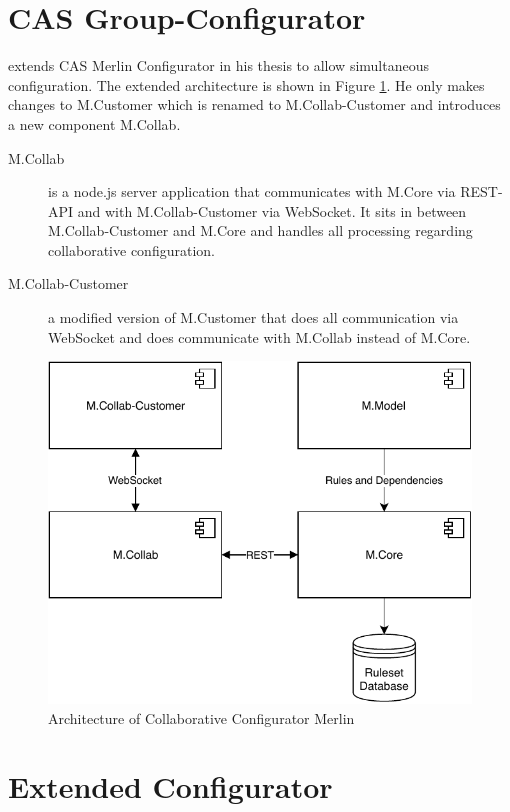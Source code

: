 \section{CAS Group-Configurator}
\label{sec:Concept:GroupConfigurator}


\citeauthor{raabKollaborativeProduktkonfigurationEchtzeit2019} extends CAS Merlin Configurator in his thesis to allow simultaneous configuration. The extended architecture is shown in Figure \ref{fig:Concept:CollaborativeConfiguratorMerlin}.
He only makes changes to M.Customer which is renamed to M.Collab-Customer and introduces a new component M.Collab.

\begin{description}
    \item[M.Collab] is a node.js server application that communicates with M.Core via REST-API and with M.Collab-Customer via WebSocket. It sits in between M.Collab-Customer and M.Core and handles all processing regarding collaborative configuration.
    \item[M.Collab-Customer] a modified version of M.Customer that does all communication via WebSocket and does communicate with M.Collab instead of M.Core.
\end{description}

\begin{figure}
    \centering
    \includegraphics{./figures/MerlinCollaborativeConfigurator.pdf}
    \caption{Architecture of Collaborative Configurator Merlin \cite[Fig. 4.3]{raabKollaborativeProduktkonfigurationEchtzeit2019}}
    \label{fig:Concept:CollaborativeConfiguratorMerlin}
\end{figure}

\section{Extended Configurator}
\label{sec:Concept:ExtendedConfigurator}
